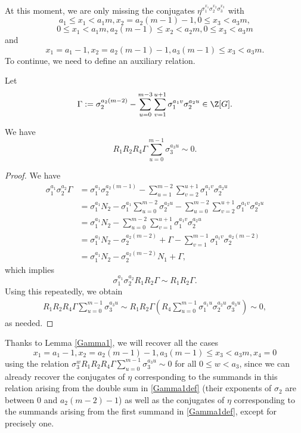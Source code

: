 \paragraph*{}
At this moment, we are only missing the conjugates $\eta^{\sigma_1^{x_1}\sigma_2^{x_2}\sigma_3^{x_3}}$ with $$a_1\le x_1< a_1m, x_2=a_2(m-1)-1, 0\le x_3<a_3m,$$ $$0\le x_1< a_1m, a_2(m-1)\le x_2<a_2m, 0\le x_3<a_3m$$ and $$x_1=a_1-1, x_2=a_2(m-1)-1, a_3(m-1)\le x_3<a_3m.$$ To continue, we need to define an auxiliary relation.

Let 
\begin{equation}\label{Gamma1def}
\Gamma:=\sigma_2^{a_2(m-2)}-\sum_{u=0}^{m-3}\sum_{v=1}^{u+1}\sigma_1^{a_1v}\sigma_2^{a_2u}\in\Z[G].
\end{equation}

\begin{lemma}\label{Gamma1}
We have $$R_1R_2R_4\Gamma\sum_{u=0}^{m-1}\sigma_3^{a_3u}\sim 0.$$
\end{lemma}
\begin{proof}
We have 
\begin{align*}
\sigma_1^{a_1}\sigma_2^{a_2}\Gamma &=\sigma_1^{a_1}\sigma_2^{a_2(m-1)}-\sum_{u=1}^{m-2}\sum_{v=2}^{u+1}\sigma_1^{a_1v}\sigma_2^{a_2u}\\
&=\sigma_1^{a_1}N_2-\sigma_1^{a_1}\sum_{u=0}^{m-2}\sigma_2^{a_2u}-\sum_{u=0}^{m-2}\sum_{v=2}^{u+1}\sigma_1^{a_1v}\sigma_2^{a_2u}\\
&=\sigma_1^{a_1}N_2-\sum_{u=0}^{m-2}\sum_{v=1}^{u+1}\sigma_1^{a_1v}\sigma_2^{a_2u}\\
&=\sigma_1^{a_1}N_2-\sigma_2^{a_2(m-2)}+\Gamma-\sum_{v=1}^{m-1}\sigma_1^{a_1v}\sigma_2^{a_2(m-2)}\\
&=\sigma_1^{a_1}N_2-\sigma_2^{a_2(m-2)}N_1+\Gamma,
\end{align*}
which implies $$\sigma_1^{a_1}\sigma_2^{a_2}R_1R_2\Gamma \sim R_1R_2\Gamma.$$
Using this repeatedly, we obtain
\begin{align*}
R_1R_2R_4\Gamma\sum_{u=0}^{m-1}\sigma_3^{a_3u} \sim R_1R_2\Gamma \left(R_4 \sum_{u=0}^{m-1}\sigma_1^{a_1u}\sigma_2^{a_2u}\sigma_3^{a_3u}\right)\sim 0,
\end{align*}
as needed.
\end{proof}

Thanks to Lemma \ref{Gamma1}, we will recover all the cases $$x_1=a_1-1, x_2=a_2(m-1)-1, a_3(m-1)\le x_3<a_3m,x_4=0$$ using the relation $\sigma_3^{w}R_1R_2R_4\Gamma\sum_{u=0}^{m-1}\sigma_3^{a_3u}\sim 0$ for all $0\le w< a_3$, since we can already recover the conjugates of $\eta$ corresponding to the summands in this relation arising from the double sum in \eqref{Gamma1def} (their exponents of $\sigma_2$ are between $0$ and $a_2(m-2)-1$) as well as the conjugates of $\eta$ corresponding to the summands arising from the first summand in \eqref{Gamma1def}, except for precisely one.

